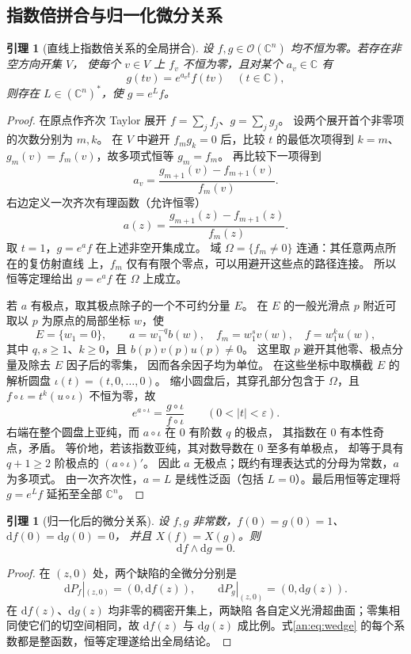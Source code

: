 \documentclass[11pt,a4paper,oneside,openany]{book}
\theoremstyle{lecture}
\newtheorem{lemma}[theorem]{引理}
\newcommand{\C}{\mathbb C}
\newcommand{\OO}{\mathcal O}
\newcommand{\dd}{\mathrm d}
\newcommand{\e}{e}
\numberwithin{equation}{section}
\begin{document}
\subsection{指数倍拼合与归一化微分关系}

\begin{lemma}[直线上指数倍关系的全局拼合]\label{an:lem:gaugegluing}
设 $f,g\in\OO(\C^n)$ 均不恒为零。若存在非空方向开集 $V$，
使每个 $v\in V$ 上 $f_v$ 不恒为零，且对某个 $a_v\in\C$ 有
\[
 g(tv)=\e^{a_vt}f(tv)\quad(t\in\C),
\]
则存在 $L\in(\C^n)^*$，使 $g=\e^L f$。
\end{lemma}
\begin{proof}
在原点作齐次 Taylor 展开 $f=\sum_j f_j$、$g=\sum_j g_j$。
设两个展开首个非零项的次数分别为 $m,k$。
在 $V$ 中避开 $f_mg_k=0$ 后，比较 $t$ 的最低次项得到
$k=m$、$g_m(v)=f_m(v)$，故多项式恒等 $g_m=f_m$。
再比较下一项得到
\[
 a_v=\frac{g_{m+1}(v)-f_{m+1}(v)}{f_m(v)}.
\]
右边定义一次齐次有理函数（允许恒零）
\begin{equation}\label{an:eq:rationalgauge}
 a(z)=\frac{g_{m+1}(z)-f_{m+1}(z)}{f_m(z)}.
\end{equation}
取 $t=1$，$g=\e^a f$ 在上述非空开集成立。
域 $\Omega=\{f_m\ne0\}$ 连通：其任意两点所在的复仿射直线
上，$f_m$ 仅有有限个零点，可以用避开这些点的路径连接。
所以恒等定理给出 $g=\e^a f$ 在 $\Omega$ 上成立。

若 $a$ 有极点，取其极点除子的一个不可约分量 $E$。
在 $E$ 的一般光滑点 $p$ 附近可取以 $p$ 为原点的局部坐标 $w$，使
\[
 E=\{w_1=0\},\qquad
 a=w_1^{-q}b(w),\quad f_m=w_1^{s}v(w),\quad f=w_1^{k}u(w),
\]
其中 $q,s\ge1$、$k\ge0$，且 $b(p)v(p)u(p)\ne0$。
这里取 $p$ 避开其他零、极点分量及除去 $E$ 因子后的零集，
因而各余因子均为单位。
在这些坐标中取横截 $E$ 的解析圆盘 $\iota(t)=(t,0,\ldots,0)$。
缩小圆盘后，其穿孔部分包含于 $\Omega$，且 $f\circ\iota=t^k(u\circ\iota)$ 不恒为零，故
\[
 \e^{a\circ\iota}=
 \frac{g\circ\iota}{f\circ\iota}\qquad(0<|t|<\varepsilon).
\]
右端在整个圆盘上亚纯，而 $a\circ\iota$ 在 $0$ 有阶数 $q$ 的极点，
其指数在 $0$ 有本性奇点，矛盾。
等价地，若该指数亚纯，其对数导数在 $0$ 至多有单极点，
却等于具有 $q+1\ge2$ 阶极点的 $(a\circ\iota)'$。
因此 $a$ 无极点；既约有理表达式的分母为常数，$a$ 为多项式。
由一次齐次性，$a=L$ 是线性泛函（包括 $L=0$）。最后用恒等定理将
$g=\e^L f$ 延拓至全部 $\C^n$。
\end{proof}

\begin{lemma}[归一化后的微分关系]\label{an:lem:wedge}
设 $f,g$ 非常数，$f(0)=g(0)=1$、$\dd f(0)=\dd g(0)=0$，
并且 $X(f)=X(g)$。则
\begin{equation}\label{an:eq:wedge}
 \dd f\wedge\dd g=0.
\end{equation}
\end{lemma}
\begin{proof}
在 $(z,0)$ 处，两个缺陷的全微分分别是
\[
 \dd P_f|_{(z,0)}=(0,\dd f(z)),\qquad
 \dd P_g|_{(z,0)}=(0,\dd g(z)).
\]
在 $\dd f(z)$、$\dd g(z)$ 均非零的稠密开集上，两缺陷
各自定义光滑超曲面；零集相同使它们的切空间相同，故
$\dd f(z)$ 与 $\dd g(z)$ 成比例。式\eqref{an:eq:wedge}
的每个系数都是整函数，恒等定理遂给出全局结论。
\end{proof}
\end{document}
